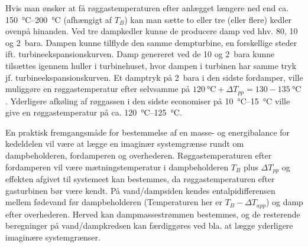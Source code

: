 Hvis man ønsker at få røggastemperaturen efter anlægget længere ned end ca. \qty{150}{\celsius}--\qty{200}{\celsius} (afhængigt af $T_B$) kan man sætte to eller tre (eller flere) kedler ovenpå hinanden. Ved tre dampkedler kunne de producere damp ved hhv. 80, 10 og \qty{2}{bara}. Dampen kunne tilflyde den samme dempturbine, en forskellige steder ift. turbineekspansionskurven. Damp genereret ved de 10 og \qty{2}{bara} kunne tilsættes igennem huller i turbinehuset, hvor dampen i turbinen har samme tryk jf. turbineekspansionskurven. Et damptryk på \qty{2}{bara} i den sidste fordamper, ville muliggøre en røggastemperatur efter selvsamme på $\qty{120}{\celsius} + \Delta T_{pp} = 130 - \qty{135}{\celsius}$. Yderligere afkøling af røggassen i den sidste economiser på \qty{10}{\celsius}--\qty{15}{\celsius} ville give en røggastemperatur på ca. \qty{120}{\celsius}--\qty{125}{\celsius}.

En praktisk fremgangsmåde for bestemmelse af en masse- og energibalance for kedeldelen vil være at lægge en imaginær systemgrænse rundt om dampbeholderen, fordamperen og overhederen. Røggastemperaturen efter fordamperen vil være mætningstemperatur i dampbeholderen $T_B$ plus $\Delta T_{pp}$ og effekten afgivet til systemeet kan bestemmes, da røggastemperaturen efter gasturbinen bør være kendt. På vand/dampsiden kendes entalpidifferensen mellem fødevand før dampbeholderen (Temperaturen her er $T_B - \Delta T_{app}$) og damp efter overhederen. Herved kan dampmassestrømmen bestemmes, og de resterende beregninger på vand/dampkredsen kan færdiggøres ved bla. at lægge yderligere imaginære systemgrænser.
